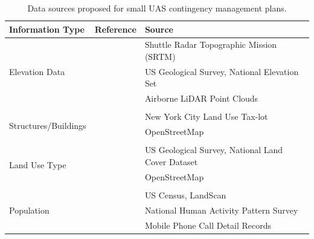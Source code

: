 \begin{table}[ht]
\centering
\caption{Data sources proposed for small UAS contingency management plans.}
\label{table:ch1_datasources}
\begin{tabular}{@{}lll@{}}
\toprule
Information Type & Reference & Source \\ 
\midrule
\multirow[t]{3}{*}{Elevation Data}                   & \cite{bleier_risk_2015, garg_terrain-based_2015} & Shuttle Radar Topographic Mission (SRTM) \\
                                                     &  \cite{ten_harmsel_emergency_2017} & US Geological Survey, National Elevation Set \\
                                                     &  \cite{frantis_emergency_2011, yan_safe_2020, maturana_3d_2015} & Airborne LiDAR Point Clouds \\
                                                     & & \\
                                                  
\multirow[t]{3}{*}{Structures/Buildings}            & \cite{ten_harmsel_emergency_2017} & New York City Land Use Tax-lot \\
                                                    & \cite{di_donato_evaluating_2017, bleier_risk_2015}  & OpenStreetMap \\
                                                    & & \\
                                                    
\multirow[t]{3}{*}{Land Use Type}                   & \cite{ten_harmsel_emergency_2017} & US Geological Survey, National Land Cover Dataset \\
                                                    & \cite{di_donato_evaluating_2017, bleier_risk_2015} & OpenStreetMap \\
                                                    & & \\
                                                  
\multirow[t]{3}{*}{Population}                      & \cite{ten_harmsel_emergency_2017, poissant_mitigation_2020} & US Census, LandScan \\
                                                    & \cite{melnyk_third-party_2014-1}  & National Human Activity Pattern Survey \\
                                                    & \cite{di_donato_evaluating_2017}  & Mobile Phone Call Detail Records \\
                                                  
\bottomrule
\end{tabular}
\end{table}

